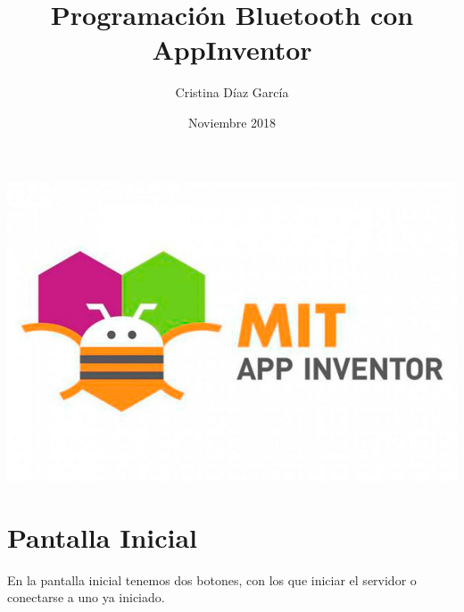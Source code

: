 \documentclass{article}
\title{Programación Bluetooth con AppInventor}
\author{Cristina Díaz García}
\date{Noviembre 2018}
\begin{document}

\begin{titlingpage}
\maketitle

\begin{center}
\includegraphics[scale=0.5]{imagenes/AppInventor.jpg} 
\end{center}

\end{titlingpage}

\newpage

\tableofcontents

\newpage

\section{Pantalla Inicial}

En la pantalla inicial tenemos dos botones, con los que iniciar el servidor o conectarse a uno ya iniciado. 
\end{document}
